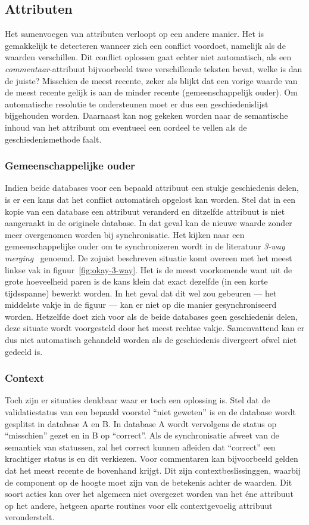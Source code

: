 \subsection{Attributen}
Het samenvoegen van attributen verloopt op een andere manier. Het is gemakkelijk te detecteren wanneer zich een conflict voordoet, namelijk als de waarden verschillen. Dit conflict oplossen gaat echter niet automatisch, als een \emph{commentaar}-attribuut bijvoorbeeld twee verschillende teksten bevat, welke is dan de juiste? Misschien de meest recente, zeker als blijkt dat een vorige waarde van de meest recente gelijk is aan de minder recente (gemeenschappelijk ouder). Om automatische resolutie te ondersteunen moet er dus een geschiedenislijst bijgehouden worden. Daarnaast kan nog gekeken worden naar de semantische inhoud van het attribuut om eventueel een oordeel te vellen als de geschiedenismethode faalt.

\subsubsection{Gemeenschappelijke ouder}
Indien beide databases voor een bepaald attribuut een stukje geschiedenis delen, is er een kans dat het conflict automatisch opgelost kan worden. Stel dat in een kopie van een database een attribuut veranderd en ditzelfde attribuut is niet aangeraakt in de originele database. In dat geval kan de nieuwe waarde zonder meer overgenomen worden bij synchronisatie. Het kijken naar een gemeenschappelijke ouder om te synchronizeren wordt in de literatuur \emph{3-way merging}~\cite{sync:diff3} genoemd. De zojuist beschreven situatie komt overeen met het meest linkse vak in figuur~\ref{fig:okay-3-way}. Het is de meest voorkomende want uit de grote hoeveelheid paren is de kans klein dat exact dezelfde (in een korte tijdsspanne) bewerkt worden. In het geval dat dit wel zou gebeuren --- het middelste vakje in de figuur --- kan er niet op die manier gesynchroniseerd worden. Hetzelfde doet zich voor als de beide databases geen geschiedenis delen, deze situate wordt voorgesteld door het meest rechtse vakje. Samenvattend kan er dus niet automatisch gehandeld worden als de geschiedenis divergeert ofwel niet gedeeld is.

\subsubsection{Context}
Toch zijn er situaties denkbaar waar er toch een oplossing is. Stel dat de validatiestatus van een bepaald voorstel ``niet geweten'' is en de database wordt gesplitst in database A en B. In database A wordt vervolgens de status op ``misschien'' gezet en in B op ``correct''. Als de synchronisatie afweet van de semantiek van statussen, zal het correct kunnen afleiden dat ``correct'' een krachtiger status is en dit verkiezen. Voor commentaren kan bijvoorbeeld gelden dat het meest recente de bovenhand krijgt. Dit zijn contextbeslissinggen, waarbij de component op de hoogte moet zijn van de betekenis achter de waarden. Dit soort acties kan over het algemeen niet overgezet worden van het \'ene attribuut op het andere, hetgeen aparte routines voor elk contextgevoelig attribuut veronderstelt.\\

